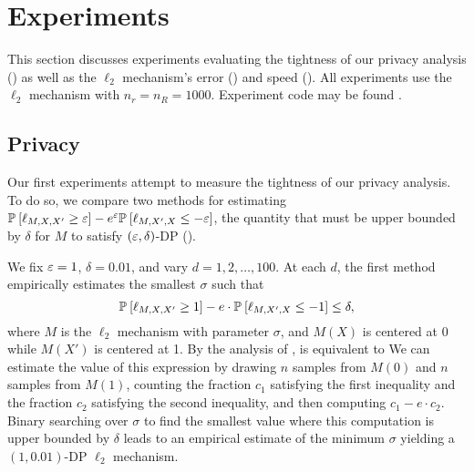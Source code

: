\section{Experiments}
\label{sec:experiments}
This section discusses experiments evaluating the tightness of our privacy analysis () as well as the $\ell_2$  mechanism's error () and speed (). All experiments use the $\ell_2$ mechanism with $n_r = n_R =1000$. Experiment code may be found .

\subsection{Privacy}
\label{subsec:experiments_privacy}
Our first experiments attempt to measure the tightness of our privacy analysis. To do so, we compare two methods for estimating $\mathbb{P}_{}\left[\ell_{M,X,X'} \geq \varepsilon\right] - e^\varepsilon \mathbb{P}_{}\left[\ell_{M,X',X}  \leq -\varepsilon\right]$, the quantity that must be upper bounded by $\delta$ for $M$ to satisfy $(\varepsilon, \delta)$-DP ().

We fix $\varepsilon = 1$, $\delta = 0.01$, and vary $d = 1, 2, \ldots, 100$. At each $d$, the first method empirically estimates the smallest $\sigma$ such that  \begin{equation}
\label{eq:empirical_privacy}
    \P{}{\ell_{M,X,X'} \geq 1} - e \cdot \P{}{\ell_{M,X',X}  \leq -1} \leq \delta,
\end{equation}
where $M$ is the $\ell_2$ mechanism with parameter $\sigma$, and $M(X)$ is centered at 0 while $M(X')$ is centered at 1. By the analysis of ,  is equivalent to
We can estimate the value of this expression by drawing $n$ samples from $M(0)$ and $n$ samples from $M(1)$, counting the fraction $c_1$ satisfying the first inequality and the fraction $c_2$ satisfying the second inequality, and then computing $c_1 - e \cdot c_2$. Binary searching over $\sigma$ to find the smallest value where this computation is upper bounded by $\delta$ leads to an empirical estimate of the minimum $\sigma$ yielding a $(1, 0.01)$-DP $\ell_2$ mechanism.

